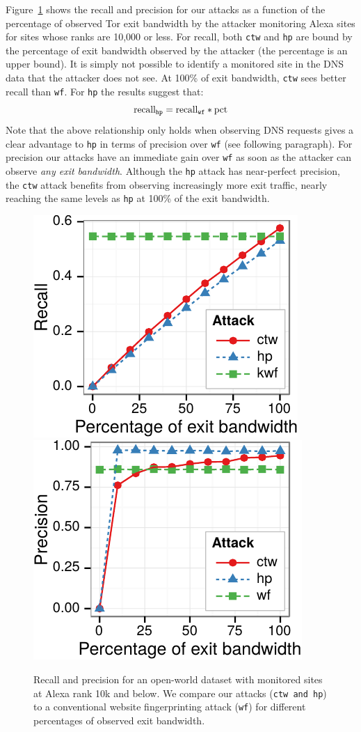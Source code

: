 Figure~\ref{fig:fpt:torpct} shows the recall and precision for our \name
attacks as a function of the percentage of observed Tor exit bandwidth by the
attacker monitoring Alexa sites for sites whose ranks are 10,000 or less.
For recall, both \texttt{ctw} and \texttt{hp} are bound by the
percentage of exit bandwidth observed by the attacker (the percentage is an
upper bound).
It is simply not possible to identify a monitored site in the DNS data that
the attacker does not see. At 100\% of exit bandwidth, \texttt{ctw} sees
better recall than \texttt{wf}. For \texttt{hp} the results suggest that:
\begin{equation}
	\label{eq:hprecall}
	\textnormal{recall}_{\texttt{hp}} = \textnormal{recall}_{\texttt{wf}} * \textnormal{pct}
\end{equation}
Note that the above relationship only holds when observing DNS requests gives
a clear advantage to \texttt{hp} in terms of precision over \texttt{wf} (see
following paragraph).
For precision our attacks have an immediate gain over \texttt{wf} as soon as
the attacker can observe \emph{any exit bandwidth}.
Although the \texttt{hp} attack has near-perfect precision, the
\texttt{ctw} attack benefits from observing increasingly more exit traffic,
nearly reaching the same levels as \texttt{hp} at 100\% of the exit bandwidth.


\begin{figure}[t]
\centering
	\includegraphics[width=0.465\linewidth]{figures/fpt/pct/1kx100+100k-recall-ggplot2}
	\includegraphics[width=0.465\linewidth]{figures/fpt/pct/1kx100+100k-precision-ggplot2}
\caption{Recall and precision for an open-world dataset with monitored sites
at Alexa rank 10k and below. We compare our attacks (\texttt{ctw and
 \texttt{hp}}) to a conventional website fingerprinting attack (\texttt{wf}) for different
 percentages of observed exit bandwidth. }
\label{fig:fpt:torpct}
\end{figure}


